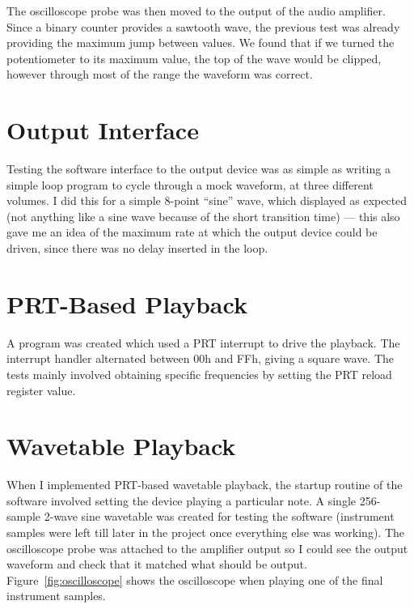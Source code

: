 The oscilloscope probe was then moved to the output of the audio amplifier.  Since a binary counter 
provides a sawtooth wave, the previous test was already providing the maximum jump between values.  
We found that if we turned the potentiometer to its maximum value, the top of the wave would be 
clipped, however through most of the range the waveform was correct.


\section{Output Interface}

Testing the software interface to the output device was as simple as writing a simple loop program 
to cycle through a mock waveform, at three different volumes.  I did this for a simple 8-point 
``sine'' wave, which displayed as expected (not anything like a sine wave because of the short 
transition time) --- this also gave me an idea of the maximum rate at which the output device could 
be driven, since there was no delay inserted in the loop.

\section{PRT-Based Playback}

A program was created which used a PRT interrupt to drive the playback.  The interrupt handler 
alternated between 00h and FFh, giving a square wave.  The tests mainly involved obtaining specific 
frequencies by setting the PRT reload register value.

\section{Wavetable Playback}

When I implemented PRT-based wavetable playback, the startup routine of the software involved 
setting the device playing a particular note.  A single 256-sample 2-wave sine wavetable was created 
for testing the software (instrument samples were left till later in the project once everything 
else was working).  The oscilloscope probe was attached to the amplifier output so I could see the 
output waveform and check that it matched what should be output.  Figure~\ref{fig:oscilloscope} 
shows the oscilloscope when playing one of the final instrument samples.


